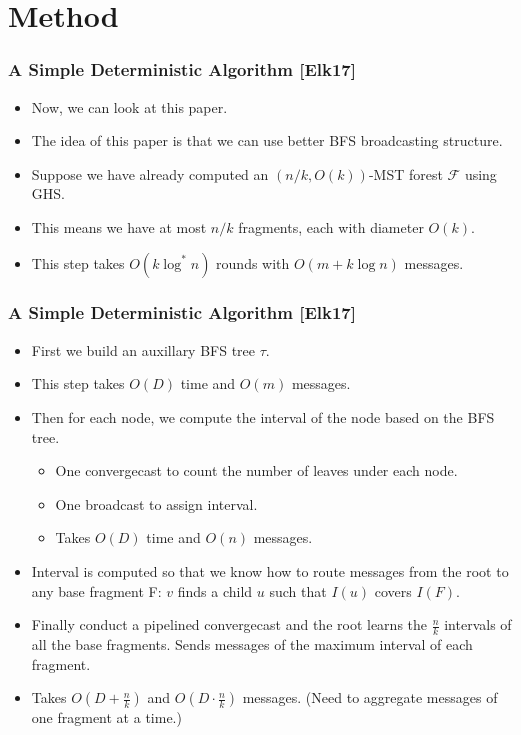 \section{Method}

\begin{frame}
\frametitle{A Simple Deterministic Algorithm [Elk17]}
\begin{itemize}
    \item Now, we can look at this paper.
    \item The idea of this paper is that we can use better BFS broadcasting structure.
    \item Suppose we have already computed an $(n/k,O(k))$-MST forest $\mathcal{F}$ using GHS. 
    \item This means we have at most $n/k$ fragments, each with diameter $O(k)$.
    \item This step takes $O(k \log^*n)$ rounds with $O(m + k \log n)$ messages.
\end{itemize}
\end{frame}


\begin{frame}
\frametitle{A Simple Deterministic Algorithm [Elk17]}
\begin{itemize}
    \item First we build an auxillary BFS tree $\tau$.
    \item This step takes $O(D)$ time and $O(m)$ messages.
    \item Then for each node, we compute the interval of the node based on the BFS tree.
    \begin{itemize}
        \item One convergecast to count the number of leaves under each node.
        \item One broadcast to assign interval.
        \item Takes $O(D)$ time and $O(n)$ messages.
    \end{itemize}
    \item Interval is computed so that we know how to route messages from the root to any base fragment F: $v$ finds a child $u$ such that $I(u)$ covers $I(F)$.
    \item Finally conduct a pipelined convergecast and the root learns the $\frac{n}{k}$ intervals of all the base fragments. Sends messages of the maximum interval of each fragment.
    \item Takes $O(D+\frac{n}{k})$ and $O(D \cdot \frac{n}{k})$ messages. (Need to aggregate messages of one fragment at a time.)
\end{itemize}
\end{frame}

